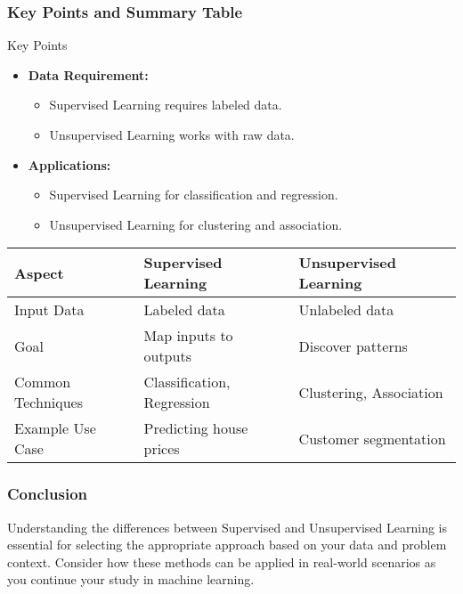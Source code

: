 \documentclass[aspectratio=169]{beamer}
\begin{document}
\begin{frame}[fragile]
    \frametitle{Key Points and Summary Table}
    \begin{block}{Key Points}
        \begin{itemize}
            \item \textbf{Data Requirement:}
                \begin{itemize}
                    \item Supervised Learning requires labeled data.
                    \item Unsupervised Learning works with raw data.
                \end{itemize}
            \item \textbf{Applications:}
                \begin{itemize}
                    \item Supervised Learning for classification and regression.
                    \item Unsupervised Learning for clustering and association.
                \end{itemize}
        \end{itemize}
    \end{block}

    \begin{table}
        \centering
        \begin{tabular}{|l|l|l|}
            \hline
            \textbf{Aspect} & \textbf{Supervised Learning} & \textbf{Unsupervised Learning} \\
            \hline
            Input Data & Labeled data & Unlabeled data \\
            Goal & Map inputs to outputs & Discover patterns \\
            Common Techniques & Classification, Regression & Clustering, Association \\
            Example Use Case & Predicting house prices & Customer segmentation \\
            \hline
        \end{tabular}
    \end{table}
\end{frame}

\begin{frame}[fragile]
    \frametitle{Conclusion}
    Understanding the differences between Supervised and Unsupervised Learning is essential for selecting the appropriate approach based on your data and problem context. Consider how these methods can be applied in real-world scenarios as you continue your study in machine learning.
\end{frame}
\end{document}
